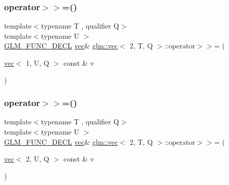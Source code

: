 \mbox{\label{structglm_1_1vec_3_012_00_01_t_00_01_q_01_4_a6f9dfd8f7093aad6a2d57e830a990016}} 
\subsubsection{\texorpdfstring{operator$>$$>$=()}{operator>>=()}\hspace{0.1cm}{\footnotesize\ttfamily [2/6]}}
{\footnotesize\ttfamily template$<$typename T , qualifier Q$>$ \\
template$<$typename U $>$ \\
\mbox{\hyperlink{setup_8hpp_ab2d052de21a70539923e9bcbf6e83a51}{G\+L\+M\+\_\+\+F\+U\+N\+C\+\_\+\+D\+E\+CL}} \mbox{\hyperlink{structglm_1_1vec}{vec}}\& \mbox{\hyperlink{structglm_1_1vec}{glm\+::vec}}$<$ 2, T, Q $>$\+::operator$>$$>$= (\begin{DoxyParamCaption}\item[{\mbox{\hyperlink{structglm_1_1vec}{vec}}$<$ 1, U, Q $>$ const \&}]{v }\end{DoxyParamCaption})}

\mbox{\label{structglm_1_1vec_3_012_00_01_t_00_01_q_01_4_a39d690e7942ded7dbff157a33236b797}} 
\subsubsection{\texorpdfstring{operator$>$$>$=()}{operator>>=()}\hspace{0.1cm}{\footnotesize\ttfamily [3/6]}}
{\footnotesize\ttfamily template$<$typename T , qualifier Q$>$ \\
template$<$typename U $>$ \\
\mbox{\hyperlink{setup_8hpp_ab2d052de21a70539923e9bcbf6e83a51}{G\+L\+M\+\_\+\+F\+U\+N\+C\+\_\+\+D\+E\+CL}} \mbox{\hyperlink{structglm_1_1vec}{vec}}\& \mbox{\hyperlink{structglm_1_1vec}{glm\+::vec}}$<$ 2, T, Q $>$\+::operator$>$$>$= (\begin{DoxyParamCaption}\item[{\mbox{\hyperlink{structglm_1_1vec}{vec}}$<$ 2, U, Q $>$ const \&}]{v }\end{DoxyParamCaption})}

